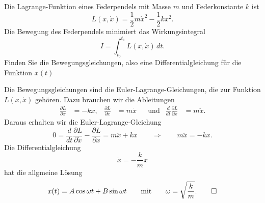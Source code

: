 Die Lagrange-Funktion eines Federpendels mit Masse $m$ und
Federkonstante $k$ ist
\[
L(x,\dot x) = \frac12m\dot x^2 - \frac12kx^2.
\]
Die Bewegung des Federpendels minimiert das Wirkungsintegral
\[
I
=
\int_{t_0}^{t_1} L(x,\dot x)\,dt.
\]
Finden Sie die Bewegungsgleichungen, also eine Differentialgleichung
für die Funktion $x(t)$

\begin{loesung}
Die Bewegungsgleichungen sind die Euler-Lagrange-Gleichungen, die zur
Funktion $L(x,\dot x)$ gehören.
Dazu brauchen wir die Ableitungen
\[
\begin{aligned}
\frac{\partial L}{\partial x}
&=
-kx,
&
\frac{\partial L}{\partial \dot x}
&=
m\dot x
&&\text{und}&
\frac{d}{dt}\frac{\partial L}{\partial\dot x}
&=
m\ddot x.
\end{aligned}
\]
Daraus erhalten wir die Euler-Lagrange-Gleichung
\[
0
=
\frac{d}{dt}\frac{\partial L}{\partial\dot x}
-\frac{\partial L}{\partial x}
=
m\ddot x+kx
\qquad\Rightarrow\qquad
m\ddot x=-kx.
\]
Die Differentialgleichung
\[
\ddot x = -\frac{k}{m}x
\]
hat die allgmeine Lösung
\[
x(t)=A\cos\omega t + B\sin\omega t
\qquad\text{mit}\qquad
\omega=\sqrt{\frac{k}{m}}.
\qedhere
\]
\end{loesung}


